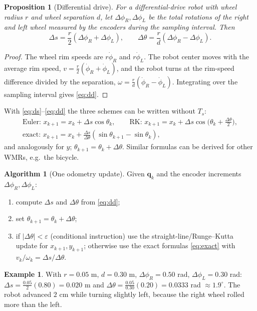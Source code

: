 \documentclass[11pt,a4paper]{article}
\newcommand{\Ts}{T_s}
\newcommand{\bq}{\boldsymbol{q}}
\theoremstyle{plain}
\newtheorem{proposition}[theorem]{Proposition}
\theoremstyle{definition}
\newtheorem{example}[theorem]{Example}
\newtheorem{algorithm}[theorem]{Algorithm}
\theoremstyle{remark}
\begin{document}
\begin{proposition}[Differential drive]\label{prop:dd}
For a differential-drive robot with wheel radius $r$ and wheel separation $d$, let
$\Delta\phi_R,\Delta\phi_L$ be the total rotations of the right and left wheel measured by the encoders
during the sampling interval. Then
\begin{equation}\label{eq:dd}
\Delta s=\frac r2(\Delta\phi_R+\Delta\phi_L),\qquad \Delta\theta=\frac rd(\Delta\phi_R-\Delta\phi_L).
\end{equation}
\end{proposition}
\begin{proof}
The wheel rim speeds are $r\dot\phi_R$ and $r\dot\phi_L$. The robot center moves with the average rim
speed, $v=\frac r2(\dot\phi_R+\dot\phi_L)$, and the robot turns at the rim-speed difference divided by the
separation, $\omega=\frac rd(\dot\phi_R-\dot\phi_L)$. Integrating over the sampling interval gives \eqref{eq:dd}.
\end{proof}

With \eqref{eq:ds}--\eqref{eq:dd} the three schemes can be written without $\Ts$:
\begin{gather*}
\text{Euler: } x_{k+1}=x_k+\Delta s\cos\theta_k,\qquad
\text{RK: } x_{k+1}=x_k+\Delta s\cos\!\big(\theta_k+\tfrac{\Delta\theta}2\big),\\
\text{exact: } x_{k+1}=x_k+\tfrac{\Delta s}{\Delta\theta}(\sin\theta_{k+1}-\sin\theta_k),
\end{gather*}
and analogously for $y$; $\theta_{k+1}=\theta_k+\Delta\theta$. Similar formulas can be derived for
other WMRs, e.g.\ the bicycle.

\begin{algorithm}[One odometry update]\label{alg:odo}
Given $\bq_k$ and the encoder increments $\Delta\phi_R,\Delta\phi_L$:
\begin{enumerate}
\item compute $\Delta s$ and $\Delta\theta$ from \eqref{eq:dd};
\item set $\theta_{k+1}=\theta_k+\Delta\theta$;
\item if $|\Delta\theta|<\varepsilon$ (conditional instruction) use the straight-line/Runge--Kutta update for $x_{k+1},y_{k+1}$;
otherwise use the exact formulas \eqref{eq:exact} with $v_k/\omega_k=\Delta s/\Delta\theta$.
\end{enumerate}
\end{algorithm}

\begin{example}
With $r=0.05$ m, $d=0.30$ m, $\Delta\phi_R=0.50$ rad, $\Delta\phi_L=0.30$ rad:
$\Delta s=\tfrac{0.05}{2}(0.80)=0.020$ m and $\Delta\theta=\tfrac{0.05}{0.30}(0.20)=0.0333$ rad $\approx1.9^\circ$.
The robot advanced $2$ cm while turning slightly left, because the right wheel rolled more than the left.
\end{example}
\end{document}
